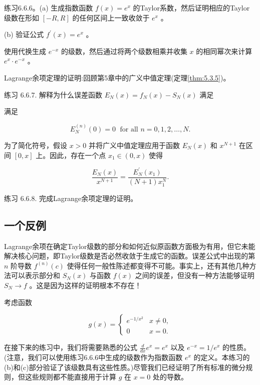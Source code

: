 练习6.6.6。(a) 生成指数函数 \(f\left( x\right)  = {e}^{x}\) 的Taylor系数，然后证明相应的Taylor级数在形如 \(\left\lbrack  {-R,R}\right\rbrack\) 的任何区间上一致收敛于 \({e}^{x}\) 。

(b) 验证公式 \({f}^{\prime }\left( x\right)  = {e}^{x}\) 。

使用代换生成 \({e}^{-x}\) 的级数，然后通过将两个级数相乘并收集 \(x\) 的相同幂次来计算 \({e}^{x} \cdot  {e}^{-x}\) 。

Lagrange余项定理的证明:回顾第5章中的广义中值定理(定理\ref{thm:5.3.5})。

练习 6.6.7. 解释为什么误差函数 \({E}_{N}\left( x\right)  = {f}_{N}\left( x\right)  - {S}_{N}\left( x\right)\) 满足

满足

\[
{E}_{N}^{\left( n\right) }\left( 0\right)  = 0\;\text{ for all }n = 0,1,2,\ldots ,N.
\]

为了简化符号，假设 \(x > 0\) 并将广义中值定理应用于函数 \({E}_{N}\left( x\right)\) 和 \({x}^{N + 1}\) 在区间 \(\left\lbrack  {0,x}\right\rbrack\) 上。因此，存在一个点 \({x}_{1} \in  \left( {0,x}\right)\) 使得

\[
\frac{{E}_{N}\left( x\right) }{{x}^{N + 1}} = \frac{{E}_{N}^{\prime }\left( {x}_{1}\right) }{\left( {N + 1}\right) {x}_{1}^{N}}.
\]

练习 6.6.8. 完成Lagrange余项定理的证明。

\subsection{一个反例}

Lagrange余项在确定Taylor级数的部分和如何近似原函数方面极为有用，但它未能解决核心问题，即Taylor级数是否必然收敛于生成它的函数。误差公式中出现的第 \(n\) 阶导数 \({f}^{\left( n\right) }\left( c\right)\) 使得任何一般性陈述都变得不可能。事实上，还有其他几种方法可以表示部分和 \({S}_{N}\left( x\right)\) 与函数 \(f\left( x\right)\) 之间的误差，但没有一种方法能够证明 \({S}_{N} \rightarrow  f\) 。这是因为这样的证明根本不存在！

考虑函数

\[
g\left( x\right)  = \left\{  \begin{array}{ll} {e}^{-1/{x}^{2}} & x \neq  0, \\  0 & x = 0. \end{array}\right.
\]

在接下来的练习中，我们将需要熟悉的公式 \(\frac{d}{dx}{e}^{x} = {e}^{x}\) 以及 \({e}^{-x} = 1/{e}^{x}\) 的性质。(注意，我们可以使用练习6.6.6中生成的级数作为指数函数 \({e}^{x}\) 的定义。本练习的(b)和(c)部分验证了该级数具有这些性质。)尽管我们已经证明了所有标准的微分规则，但这些规则都不能直接用于计算 \(g\) 在 \(x = 0\) 处的导数。


